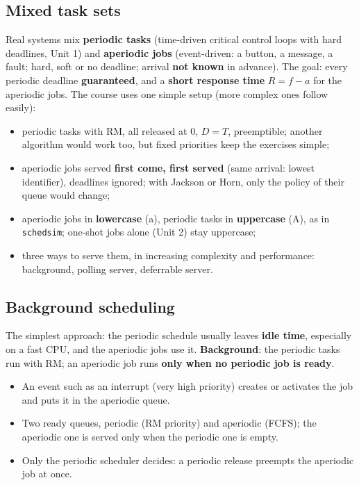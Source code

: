 \subsection{Mixed task sets}
Real systems mix \textbf{periodic tasks} (time-driven critical control loops with hard deadlines, Unit 1) and \textbf{aperiodic jobs} (event-driven: a button, a message, a fault; hard, soft or no deadline; arrival \textbf{not known} in advance). The goal: every periodic deadline \textbf{guaranteed}, and a \textbf{short response time} $R = f - a$ for the aperiodic jobs. The course uses one simple setup (more complex ones follow easily):
\begin{itemize}
    \item periodic tasks with RM, all released at 0, $D = T$, preemptible; another algorithm would work too, but fixed priorities keep the exercises simple;
    \item aperiodic jobs served \textbf{first come, first served} (same arrival: lowest identifier), deadlines ignored; with Jackson or Horn, only the policy of their queue would change;
    \item aperiodic jobs in \textbf{lowercase} (a), periodic tasks in \textbf{uppercase} (A), as in \texttt{schedsim}; one-shot jobs alone (Unit 2) stay uppercase;
    \item three ways to serve them, in increasing complexity and performance: background, polling server, deferrable server.
\end{itemize}

\subsection{Background scheduling}
The simplest approach: the periodic schedule usually leaves \textbf{idle time}, especially on a fast CPU, and the aperiodic jobs use it. \textbf{Background}: the periodic tasks run with RM; an aperiodic job runs \textbf{only when no periodic job is ready}.
\begin{itemize}
    \item An event such as an interrupt (very high priority) creates or activates the job and puts it in the aperiodic queue.
    \item Two ready queues, periodic (RM priority) and aperiodic (FCFS); the aperiodic one is served only when the periodic one is empty.
    \item Only the periodic scheduler decides: a periodic release preempts the aperiodic job at once.
\end{itemize}

